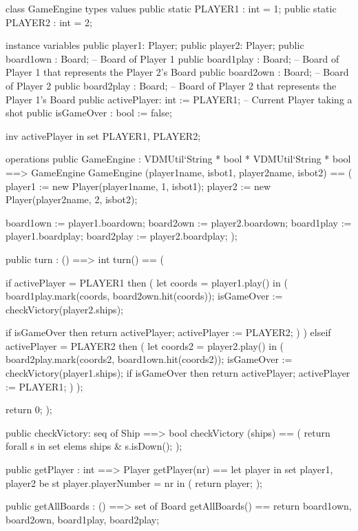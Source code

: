 \begin{vdm_al}
class GameEngine
 types
 values
  public static PLAYER1 : int = 1;
  public static PLAYER2 : int = 2;
  
 instance variables
  public player1: Player;
  public player2: Player;
  public board1own : Board; -- Board of Player 1
  public board1play : Board; -- Board of Player 1 that represents the Player 2's Board
  public board2own : Board; -- Board of Player 2 
  public board2play : Board; -- Board of Player 2 that represents the Player 1's Board
  public activePlayer: int := PLAYER1; -- Current Player taking a shot
  public isGameOver : bool := false;
  
  inv activePlayer in set {PLAYER1, PLAYER2};

 operations
  public GameEngine : VDMUtil`String * bool * VDMUtil`String * bool ==> GameEngine
   GameEngine (player1name, isbot1, player2name, isbot2) ==
   (
    player1 := new Player(player1name, 1, isbot1);
    player2 := new Player(player2name, 2, isbot2);
    
    board1own := player1.boardown;
    board2own := player2.boardown;
    board1play := player1.boardplay;
    board2play := player2.boardplay;
   );

  public turn : () ==> int
   turn() == (
   
    if activePlayer = PLAYER1 then (
     let coords = player1.play() in
     (
      board1play.mark(coords, board2own.hit(coords));
      isGameOver := checkVictory(player2.ships);
      
      if isGameOver then return activePlayer;
      activePlayer := PLAYER2;
     )
    )
    elseif activePlayer = PLAYER2 then (
     let coords2 = player2.play() in
     (
      board2play.mark(coords2, board1own.hit(coords2));
      isGameOver := checkVictory(player1.ships);
      if isGameOver then return activePlayer;
      activePlayer := PLAYER1;
     )
    );
    
    return 0;
   );
  
  public checkVictory: seq of Ship ==> bool
   checkVictory (ships) ==
   (
    return forall s in set elems ships & s.isDown(); 
   );
   
  public getPlayer : int ==> Player
   getPlayer(nr) ==
    let player in set {player1, player2} be st player.playerNumber = nr in (
      return player;
    );
    
  public getAllBoards : () ==> set of Board
   getAllBoards() ==
    return { board1own, board2own, board1play, board2play};
    

\end{vdm_al}
